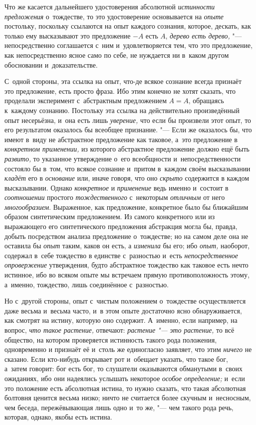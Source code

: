 Что же касается дальнейшего удостоверения абсолютной
{\em истинности предложения} о~тождестве, то это
удостоверение основывается на {\em опыте} постольку,
поскольку ссылаются на опыт каждого сознания, которое, дескать, как только
ему высказывают это предложение $-A$ есть $A$,
{\em дерево есть дерево,} "--- непосредственно соглашается
с~ним и~удовлетворяется тем, что это предложение, как непосредственно ясное
само по себе, не нуждается ни в~каком другом обосновании и~доказательстве.

С~одной стороны, эта ссылка на опыт, что-де всякое сознание всегда признаёт
это предложение, есть просто фраза. Ибо этим конечно не хотят сказать, что
проделали эксперимент с~абстрактным предложением $A=A$,
обращаясь к~каждому сознанию. Постольку эта ссылка на действительно
произведённый опыт несерьёзна, и~она есть лишь
{\em уверение,} что если бы произвели этот опыт, то его
результатом оказалось бы всеобщее признание. "--- Если же оказалось бы, что
имеют в~виду не абстрактное предложение как таковое, а~это предложение в
{\em конкретном применении,} из которого абстрактное
предложение должно ещё быть {\em развито,} то указанное
утверждение о~его всеобщности и~непосредственности состояло бы в~том, что
всякое сознание и~притом в~каждом своём высказывании
{\em кладёт} его в {\em основание}
или, иначе говоря, что оно {\em скрыто} содержится в
каждом высказывании. Однако {\em конкретное} и
{\em применение} ведь именно и~состоит в
{\em соотношении} простого
{\em тождественного} с~некоторым
{\em отличным} от него
{\em многообразием}. Выраженное, как предложение,
конкретное было бы ближайшим образом синтетическим предложением. Из самого
конкретного или из выражающего его синтетического предложения абстракция
могла бы, правда, добыть посредством анализа предложение о~тождестве; но на
самом деле она не оставила бы {\em опыт} таким, каков
он есть, а {\em изменила} бы его; ибо
{\em опыт,} наоборот, содержал в~себе тождество в
единстве с~разностью и~есть {\em непосредственное
опровержение} утверждения, будто абстрактное тождество как таковое есть
нечто истинное, ибо во всяком опыте мы встречаем прямую противоположность
этому, а~именно, тождество, лишь соединённое с~разностью.

Но с~другой стороны, опыт с~чистым положением о~тождестве осуществляется
даже весьма и~весьма часто, и~в этом опыте достаточно ясно обнаруживается,
как смотрят на истину, которую оно содержит. А~именно, если
например, на вопрос, {\em что такое растение,} отвечают:
{\em растение "--- это растение,} то всё общество,
на котором проверяется истинность такого рода положения, одновременно и
признаёт её и~столь же единогласно заявляет, что этим
{\em ничего} не сказано. Если кто-нибудь открывает рот
и~обещает указать, что такое бог, а~затем говорит: бог есть бог, то
слушатели оказываются обманутыми в~своих ожиданиях, ибо они надеялись
услышать некоторое {\em особое определение;} и~если
это положение есть абсолютная истина, то нужно сказать, что такая
абсолютная болтовня ценится весьма низко; ничто не считается более скучным
и~несносным, чем беседа, пережёвывающая лишь одно и~то же, "--- чем такого
рода речь, которая, однако, якобы есть истина.

